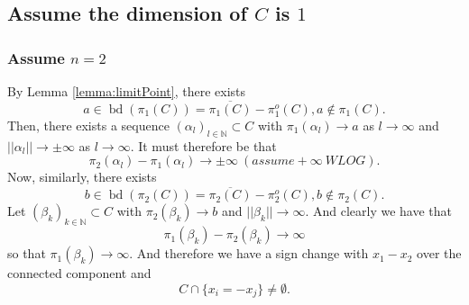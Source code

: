 \documentclass[11pt]{article}
\theoremstyle{definition}
\newcommand{\N}{\mathbb{N}}
\DeclareMathOperator{\bd}{bd}
\begin{document}
\subsection*{Assume the dimension of $C$ is $1$}

\subsubsection*{Assume $n=2$}
By Lemma \ref{lemma:limitPoint}, there exists 
\[
a \in \bd(\pi_1(C)) = \overline{\pi_1(C)} - \pi_1^o(C), a \not \in \pi_1(C).
\]
Then, there exists a sequence $(\alpha_l)_{l \in \N} \subset C$ with $\pi_1(\alpha_l) \rightarrow a$ as $l \rightarrow \infty$ and $|| \alpha_l|| \rightarrow \pm\infty$ as $l \rightarrow \infty.$ It must therefore be that 
\[
\pi_2(\alpha_l) - \pi_1(\alpha_l) \rightarrow \pm\infty ~(assume +\infty~ WLOG).
\]
Now, similarly, there exists 
\[
b \in \bd(\pi_2(C)) = \overline{\pi_2(C)} - \pi_2^o(C), b \not \in \pi_2(C).
\]
Let $(\beta_k)_{k \in \N} \subset C$ with $\pi_2(\beta_k) \rightarrow b$ and $|| \beta_k|| \rightarrow \infty.$ And clearly we have that 
\[
\pi_1(\beta_k) - \pi_2(\beta_k) \rightarrow \infty
\]
so that $\pi_1(\beta_k) \rightarrow \infty.$ And therefore we have a sign change with $x_1-x_2$ over the connected component and 
    \[
C \cap \{ x_i= -x_j\} \not = \emptyset. 
    \]




\end{document}
